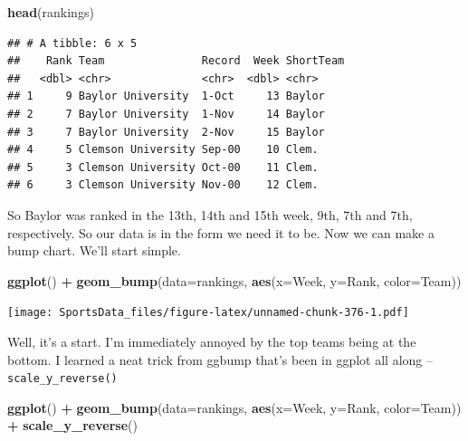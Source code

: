 \documentclass[
]{book}
\newenvironment{Shaded}{\begin{snugshade}}{\end{snugshade}}
\newcommand{\DataTypeTok}[1]{\textcolor[rgb]{0.13,0.29,0.53}{#1}}
\newcommand{\KeywordTok}[1]{\textcolor[rgb]{0.13,0.29,0.53}{\textbf{#1}}}
\newcommand{\NormalTok}[1]{#1}
\newcommand{\OperatorTok}[1]{\textcolor[rgb]{0.81,0.36,0.00}{\textbf{#1}}}
\newcommand{\StringTok}[1]{\textcolor[rgb]{0.31,0.60,0.02}{#1}}
\begin{document}
\begin{Shaded}
\begin{Highlighting}[]
\KeywordTok{head}\NormalTok{(rankings)}
\end{Highlighting}
\end{Shaded}

\begin{verbatim}
## # A tibble: 6 x 5
##    Rank Team               Record  Week ShortTeam
##   <dbl> <chr>              <chr>  <dbl> <chr>    
## 1     9 Baylor University  1-Oct     13 Baylor   
## 2     7 Baylor University  1-Nov     14 Baylor   
## 3     7 Baylor University  2-Nov     15 Baylor   
## 4     5 Clemson University Sep-00    10 Clem.    
## 5     3 Clemson University Oct-00    11 Clem.    
## 6     3 Clemson University Nov-00    12 Clem.
\end{verbatim}

So Baylor was ranked in the 13th, 14th and 15th week, 9th, 7th and 7th, respectively. So our data is in the form we need it to be. Now we can make a bump chart. We'll start simple.

\begin{Shaded}
\begin{Highlighting}[]
\KeywordTok{ggplot}\NormalTok{() }\OperatorTok{+}\StringTok{ }\KeywordTok{geom_bump}\NormalTok{(}\DataTypeTok{data=}\NormalTok{rankings, }\KeywordTok{aes}\NormalTok{(}\DataTypeTok{x=}\NormalTok{Week, }\DataTypeTok{y=}\NormalTok{Rank, }\DataTypeTok{color=}\NormalTok{Team))}
\end{Highlighting}
\end{Shaded}

\texttt{[image: SportsData\_files/figure-latex/unnamed-chunk-376-1.pdf]}

Well, it's a start. I'm immediately annoyed by the top teams being at the bottom. I learned a neat trick from ggbump that's been in ggplot all along -- \texttt{scale\_y\_reverse()}

\begin{Shaded}
\begin{Highlighting}[]
\KeywordTok{ggplot}\NormalTok{() }\OperatorTok{+}\StringTok{ }\KeywordTok{geom_bump}\NormalTok{(}\DataTypeTok{data=}\NormalTok{rankings, }\KeywordTok{aes}\NormalTok{(}\DataTypeTok{x=}\NormalTok{Week, }\DataTypeTok{y=}\NormalTok{Rank, }\DataTypeTok{color=}\NormalTok{Team)) }\OperatorTok{+}\StringTok{ }\KeywordTok{scale_y_reverse}\NormalTok{()}
\end{Highlighting}
\end{Shaded}
\end{document}
